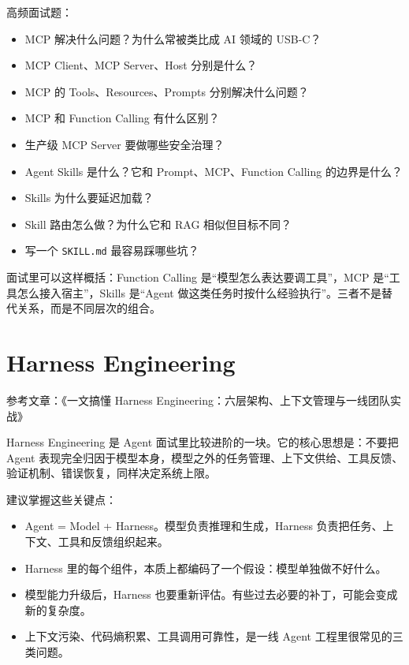 \documentclass[10pt,a4paper]{ctexart}
\begin{document}
高频面试题：


\begin{itemize}[itemsep=2pt, topsep=4pt]
  \item MCP 解决什么问题？为什么常被类比成 AI 领域的 USB-C？
  \item MCP Client、MCP Server、Host 分别是什么？
  \item MCP 的 Tools、Resources、Prompts 分别解决什么问题？
  \item MCP 和 Function Calling 有什么区别？
  \item 生产级 MCP Server 要做哪些安全治理？
  \item Agent Skills 是什么？它和 Prompt、MCP、Function Calling 的边界是什么？
  \item Skills 为什么要延迟加载？
  \item Skill 路由怎么做？为什么它和 RAG 相似但目标不同？
  \item 写一个 \texttt{SKILL.md} 最容易踩哪些坑？
\end{itemize}


面试里可以这样概括：Function Calling 是“模型怎么表达要调工具”，MCP 是“工具怎么接入宿主”，Skills 是“Agent 做这类任务时按什么经验执行”。三者不是替代关系，而是不同层次的组合。



\section{Harness Engineering}


参考文章：《一文搞懂 Harness Engineering：六层架构、上下文管理与一线团队实战》



Harness Engineering 是 Agent 面试里比较进阶的一块。它的核心思想是：不要把 Agent 表现完全归因于模型本身，模型之外的任务管理、上下文供给、工具反馈、验证机制、错误恢复，同样决定系统上限。



建议掌握这些关键点：


\begin{itemize}[itemsep=2pt, topsep=4pt]
  \item Agent = Model + Harness。模型负责推理和生成，Harness 负责把任务、上下文、工具和反馈组织起来。
  \item Harness 里的每个组件，本质上都编码了一个假设：模型单独做不好什么。
  \item 模型能力升级后，Harness 也要重新评估。有些过去必要的补丁，可能会变成新的复杂度。
  \item 上下文污染、代码熵积累、工具调用可靠性，是一线 Agent 工程里很常见的三类问题。
\end{itemize}
\end{document}
